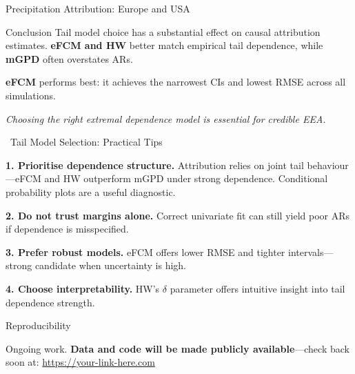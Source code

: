 \documentclass[final]{beamer}
\newlength{\colwidth}
\begin{document}
\begin{frame}[t]
\begin{columns}[t]
\begin{column}{\colwidth}
\begin{block}{Precipitation Attribution: Europe and USA}
\end{block}
\vspace{-0.6cm}
\begin{block}{Conclusion}
\small
\textbullet\hspace{0.1cm}Tail model choice has a substantial effect on causal attribution estimates. \textbf{eFCM and HW} better match empirical tail dependence, while \textbf{mGPD} often overstates ARs.

\textbullet\hspace{0.1cm}\textbf{eFCM} performs best: it achieves the narrowest CIs and lowest RMSE across all simulations.

\textbullet\hspace{0.1cm}\textit{Choosing the right extremal dependence model is essential for credible EEA.}

\end{block}


\vspace{-1cm}
\begin{minipage}[t]{0.7\linewidth}
\begin{block}{\faLightbulb\ Tail Model Selection: Practical Tips}

\footnotesize

\textbf{1. Prioritise dependence structure.}  
Attribution relies on joint tail behaviour—eFCM and HW outperform mGPD under strong dependence. Conditional probability plots are a useful diagnostic.

\textbf{2. Do not trust margins alone.}  
Correct univariate fit can still yield poor ARs if dependence is misspecified.

\textbf{3. Prefer robust models.}  
eFCM offers lower RMSE and tighter intervals—strong candidate when uncertainty is high.

\vspace{0.3em}
\textbf{4. Choose interpretability.}  
HW’s \(\delta\) parameter offers intuitive insight into tail dependence strength.

\end{block}
\vspace{-0.4cm}
\begin{block}{ Reproducibility}

Ongoing work.
\textbf{Data and code will be made publicly available}—check back soon at:  
\url{https://your-link-here.com}

\end{block}


\end{minipage}
\end{column}
\end{columns}
\end{frame}
\end{document}
